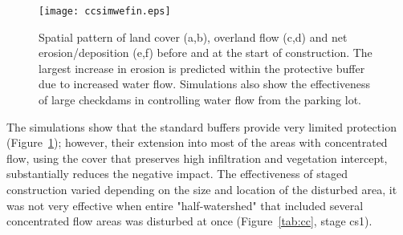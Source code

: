 \documentclass[fleqn,12pt,twoside]{article}
\begin{document}
\begin{figure}[Htb!]
\begin{center}
\texttt{[image: ccsimwefin.eps]}
\caption{Spatial pattern of land cover (a,b),
overland flow (c,d) and net erosion/deposition (e,f)
before and at the start of construction. The largest increase in erosion
is predicted within the protective buffer due
to increased water flow. Simulations also  show the effectiveness
of large checkdams in controlling water flow from the parking lot.}
\label{fig:cc}
\end{center}
\end{figure}

The simulations show that the standard buffers provide very limited protection
(Figure~\ref{fig:cc}); however, their extension into most of the areas with concentrated 
flow, using the cover that preserves high infiltration and vegetation intercept,
 substantially reduces the negative impact. The effectiveness of 
staged construction varied depending on the size and location of the disturbed 
area, it was not very effective when entire "half-watershed" that included
several concentrated flow areas was disturbed at once (Figure~\ref{tab:cc}, stage cs1).
\end{document}
